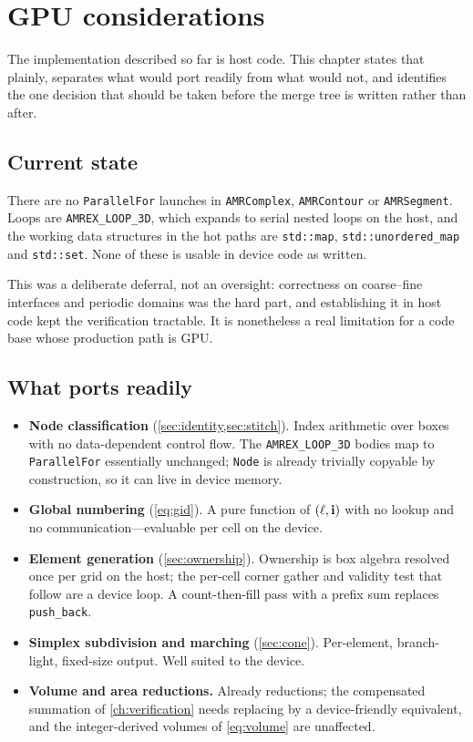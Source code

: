 \chapter{GPU considerations}
\label{ch:gpu}

The implementation described so far is host code. This chapter states that
plainly, separates what would port readily from what would not, and identifies
the one decision that should be taken before the merge tree is written rather
than after.

\section{Current state}

There are no \texttt{ParallelFor} launches in \texttt{AMRComplex},
\texttt{AMRContour} or \texttt{AMRSegment}. Loops are \texttt{AMREX\_LOOP\_3D},
which expands to serial nested loops on the host, and the working data
structures in the hot paths are \texttt{std::map}, \texttt{std::unordered\_map}
and \texttt{std::set}. None of these is usable in device code as written.

This was a deliberate deferral, not an oversight: correctness on coarse--fine
interfaces and periodic domains was the hard part, and establishing it in host
code kept the verification tractable. It is nonetheless a real limitation for a
code base whose production path is GPU.

\section{What ports readily}

\begin{itemize}[leftmargin=*]
\item \textbf{Node classification} (\cref{sec:identity,sec:stitch}). Index
  arithmetic over boxes with no data-dependent control flow. The
  \texttt{AMREX\_LOOP\_3D} bodies map to \texttt{ParallelFor} essentially
  unchanged; \texttt{Node} is already trivially copyable by construction, so it
  can live in device memory.
\item \textbf{Global numbering} (\cref{eq:gid}). A pure function of
  $(\ell,\mathbf{i})$ with no lookup and no communication---evaluable per cell on the
  device.
\item \textbf{Element generation} (\cref{sec:ownership}). Ownership is box
  algebra resolved once per grid on the host; the per-cell corner gather and
  validity test that follow are a device loop. A count-then-fill pass with a
  prefix sum replaces \texttt{push\_back}.
\item \textbf{Simplex subdivision and marching} (\cref{sec:cone}). Per-element,
  branch-light, fixed-size output. Well suited to the device.
\item \textbf{Volume and area reductions.} Already reductions; the compensated
  summation of \cref{ch:verification} needs replacing by a device-friendly
  equivalent, and the integer-derived volumes of \cref{eq:volume} are
  unaffected.
\end{itemize}

